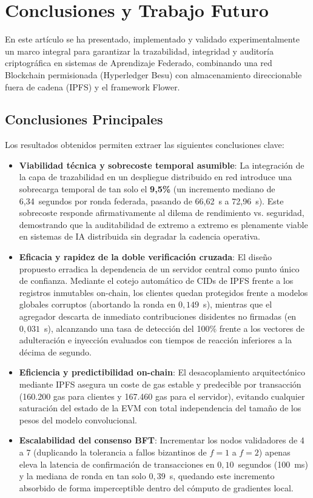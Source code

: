 \section{Conclusiones y Trabajo Futuro}
\label{sec:conclusiones}

En este artículo se ha presentado, implementado y validado experimentalmente un marco integral para garantizar la trazabilidad, integridad y auditoría criptográfica en sistemas de Aprendizaje Federado, combinando una red Blockchain permisionada (Hyperledger Besu) con almacenamiento direccionable fuera de cadena (IPFS) y el framework Flower.

\subsection{Conclusiones Principales}
Los resultados obtenidos permiten extraer las siguientes conclusiones clave:
\begin{itemize}
    \item \textbf{Viabilidad técnica y sobrecoste temporal asumible}: La integración de la capa de trazabilidad en un despliegue distribuido en red introduce una sobrecarga temporal de tan solo el \textbf{9,5\%} (un incremento mediano de 6,34~segundos por ronda federada, pasando de 66,62~s a 72,96~s). Este sobrecoste responde afirmativamente al dilema de rendimiento vs. seguridad, demostrando que la auditabilidad de extremo a extremo es plenamente viable en sistemas de IA distribuida sin degradar la cadencia operativa.
    \item \textbf{Eficacia y rapidez de la doble verificación cruzada}: El diseño propuesto erradica la dependencia de un servidor central como punto único de confianza. Mediante el cotejo automático de CIDs de IPFS frente a los registros inmutables on-chain, los clientes quedan protegidos frente a modelos globales corruptos (abortando la ronda en $0{,}149$~s), mientras que el agregador descarta de inmediato contribuciones disidentes no firmadas (en $0{,}031$~s), alcanzando una tasa de detección del 100\% frente a los vectores de adulteración e inyección evaluados con tiempos de reacción inferiores a la décima de segundo.
    \item \textbf{Eficiencia y predictibilidad on-chain}: El desacoplamiento arquitectónico mediante IPFS asegura un coste de gas estable y predecible por transacción (160.200 gas para clientes y 167.460 gas para el servidor), evitando cualquier saturación del estado de la EVM con total independencia del tamaño de los pesos del modelo convolucional.
    \item \textbf{Escalabilidad del consenso BFT}: Incrementar los nodos validadores de 4 a 7 (duplicando la tolerancia a fallos bizantinos de $f=1$ a $f=2$) apenas eleva la latencia de confirmación de transacciones en $0{,}10$~segundos (100~ms) y la mediana de ronda en tan solo $0{,}39$~s, quedando este incremento absorbido de forma imperceptible dentro del cómputo de gradientes local.
\end{itemize}

